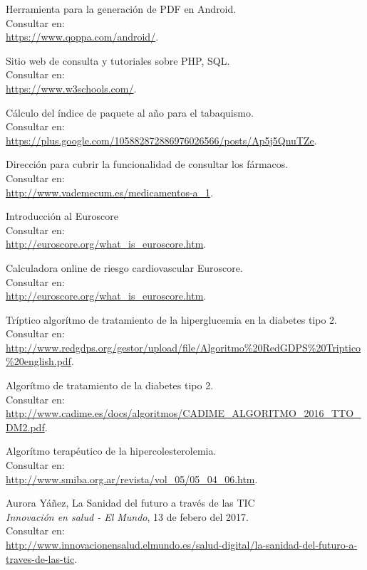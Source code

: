 \documentclass[11pt,spanish,
		listoftables,listoffigures]
		{tfgplantilla}
\begin{document}
\begin{thebibliography}{10}
   Herramienta para la generación de PDF en Android.\\
   \newblock Consultar en:\\
   \url{ https://www.qoppa.com/android/}.

   Sitio web de consulta y tutoriales sobre PHP, SQL.\\
   \newblock Consultar en:\\
   \url{ https://www.w3schools.com/}.

   Cálculo del índice de paquete al año para el tabaquismo.\\
   \newblock Consultar en:\\
   \url{ https://plus.google.com/105882872886976026566/posts/Ap5j5QnuTZe}.

   Dirección para cubrir la funcionalidad de consultar los fármacos.\\
   \newblock Consultar en:\\
   \url{ http://www.vademecum.es/medicamentos-a_1}.

   Introducción al Euroscore\\
   \newblock Consultar en:\\
   \url{ http://euroscore.org/what_is_euroscore.htm}.

   Calculadora online de riesgo cardiovascular Euroscore.\\
   \newblock Consultar en:\\
   \url{ http://euroscore.org/what_is_euroscore.htm}.

   Tríptico algorítmo de tratamiento de la hiperglucemia en la diabetes tipo 2.\\
   \newblock Consultar en:\\
   \url{ http://www.redgdps.org/gestor/upload/file/Algoritmo\%20RedGDPS\%20Triptico\%20english.pdf}.

   Algorítmo de tratamiento de la diabetes tipo 2.\\
   \newblock Consultar en:\\
   \url{ http://www.cadime.es/docs/algoritmos/CADIME_ALGORITMO_2016_TTO_DM2.pdf}.

   Algorítmo terapéutico de la hipercolesterolemia.\\
   \newblock Consultar en:\\
   \url{ http://www.smiba.org.ar/revista/vol_05/05_04_06.htm}.

   Aurora Yáñez, 
   \newblock La Sanidad del futuro a través de las TIC \\
   \newblock \textit{Innovación en salud - El Mundo}, 13 de febero del 2017.\\
   \newblock Consultar en:\\
   \url{ http://www.innovacionensalud.elmundo.es/salud-digital/la-sanidad-del-futuro-a-traves-de-las-tic}.


\end{thebibliography}
\end{document}
